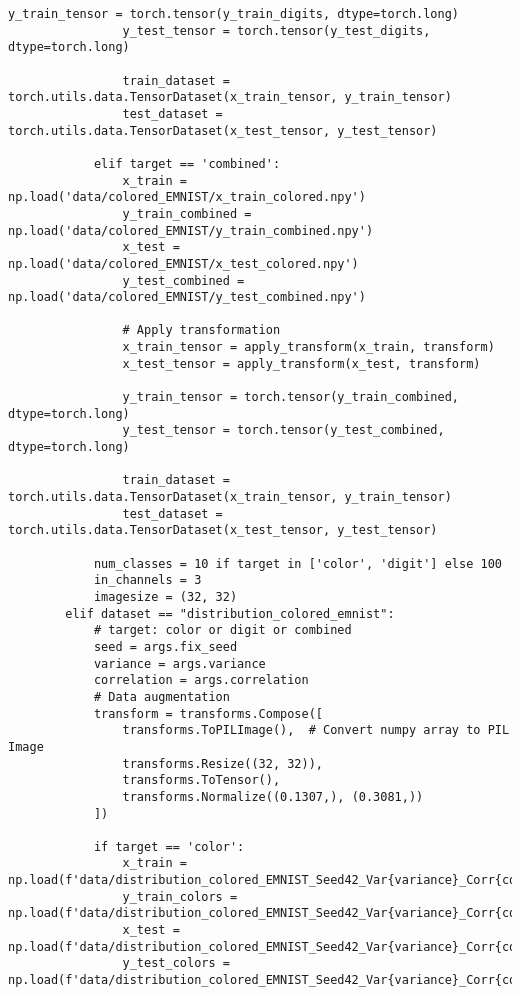 \begin{lstlisting}[style=pythonstyle, caption={Program Example}]
                y_train_tensor = torch.tensor(y_train_digits, dtype=torch.long)
                y_test_tensor = torch.tensor(y_test_digits, dtype=torch.long)
                
                train_dataset = torch.utils.data.TensorDataset(x_train_tensor, y_train_tensor)
                test_dataset = torch.utils.data.TensorDataset(x_test_tensor, y_test_tensor)
                
            elif target == 'combined':
                x_train = np.load('data/colored_EMNIST/x_train_colored.npy')
                y_train_combined = np.load('data/colored_EMNIST/y_train_combined.npy')
                x_test = np.load('data/colored_EMNIST/x_test_colored.npy')
                y_test_combined = np.load('data/colored_EMNIST/y_test_combined.npy')
                
                # Apply transformation
                x_train_tensor = apply_transform(x_train, transform)
                x_test_tensor = apply_transform(x_test, transform)
                
                y_train_tensor = torch.tensor(y_train_combined, dtype=torch.long)
                y_test_tensor = torch.tensor(y_test_combined, dtype=torch.long)
                
                train_dataset = torch.utils.data.TensorDataset(x_train_tensor, y_train_tensor)
                test_dataset = torch.utils.data.TensorDataset(x_test_tensor, y_test_tensor)
                
            num_classes = 10 if target in ['color', 'digit'] else 100
            in_channels = 3
            imagesize = (32, 32)
        elif dataset == "distribution_colored_emnist":
            # target: color or digit or combined
            seed = args.fix_seed
            variance = args.variance
            correlation = args.correlation
            # Data augmentation
            transform = transforms.Compose([
                transforms.ToPILImage(),  # Convert numpy array to PIL Image
                transforms.Resize((32, 32)),
                transforms.ToTensor(),
                transforms.Normalize((0.1307,), (0.3081,))
            ])
            
            if target == 'color':
                x_train = np.load(f'data/distribution_colored_EMNIST_Seed42_Var{variance}_Corr{correlation}/x_train_colored.npy')
                y_train_colors = np.load(f'data/distribution_colored_EMNIST_Seed42_Var{variance}_Corr{correlation}/y_train_colors.npy')
                x_test = np.load(f'data/distribution_colored_EMNIST_Seed42_Var{variance}_Corr{correlation}/x_test_colored.npy')
                y_test_colors = np.load(f'data/distribution_colored_EMNIST_Seed42_Var{variance}_Corr{correlation}/y_test_colors.npy')
                

\end{lstlisting}
